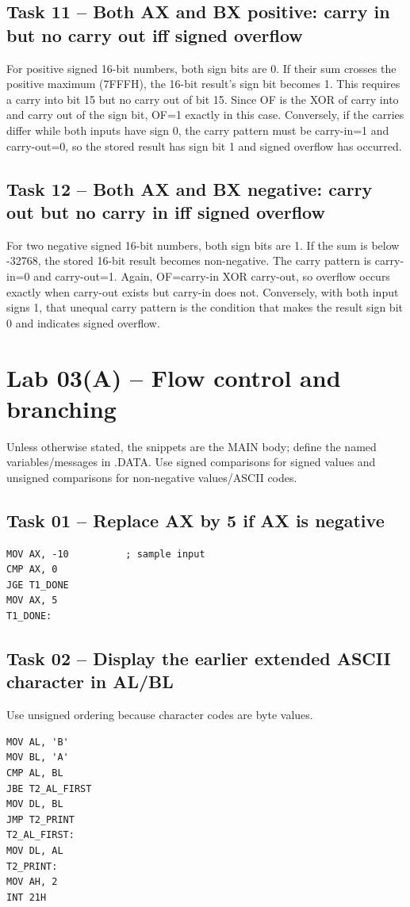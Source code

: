 \documentclass[10pt,a4paper]{article}
\begin{document}
\subsection*{Task 11 -- Both AX and BX positive: carry in but no carry out iff signed overflow}
For positive signed 16-bit numbers, both sign bits are 0. If their sum crosses the positive maximum (7FFFH), the 16-bit result's sign bit becomes 1. This requires a carry into bit 15 but no carry out of bit 15. Since OF is the XOR of carry into and carry out of the sign bit, OF=1 exactly in this case. Conversely, if the carries differ while both inputs have sign 0, the carry pattern must be carry-in=1 and carry-out=0, so the stored result has sign bit 1 and signed overflow has occurred.

\subsection*{Task 12 -- Both AX and BX negative: carry out but no carry in iff signed overflow}
For two negative signed 16-bit numbers, both sign bits are 1. If the sum is below -32768, the stored 16-bit result becomes non-negative. The carry pattern is carry-in=0 and carry-out=1. Again, OF=carry-in XOR carry-out, so overflow occurs exactly when carry-out exists but carry-in does not. Conversely, with both input signs 1, that unequal carry pattern is the condition that makes the result sign bit 0 and indicates signed overflow.

\section{Lab 03(A) -- Flow control and branching}
Unless otherwise stated, the snippets are the MAIN body; define the named variables/messages in .DATA. Use signed comparisons for signed values and unsigned comparisons for non-negative values/ASCII codes.

\subsection*{Task 01 -- Replace AX by 5 if AX is negative}
\begin{lstlisting}[style=asm]
MOV AX, -10          ; sample input
CMP AX, 0
JGE T1_DONE
MOV AX, 5
T1_DONE:
\end{lstlisting}
\subsection*{Task 02 -- Display the earlier extended ASCII character in AL/BL}
Use unsigned ordering because character codes are byte values.
\begin{lstlisting}[style=asm]
MOV AL, 'B'
MOV BL, 'A'
CMP AL, BL
JBE T2_AL_FIRST
MOV DL, BL
JMP T2_PRINT
T2_AL_FIRST:
MOV DL, AL
T2_PRINT:
MOV AH, 2
INT 21H
\end{lstlisting}
\end{document}
